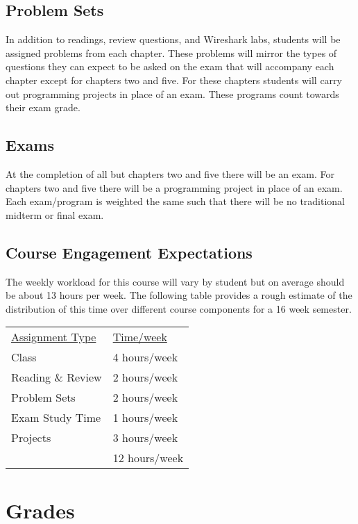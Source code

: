 \documentclass[10pt]{article}
\begin{document}
\subsection*{Problem Sets}

In addition to readings, review questions, and Wireshark labs, students will be assigned problems from each chapter. These problems will mirror the types of questions they can expect to be asked on the exam that will accompany each chapter except for chapters two and five. For these chapters students will carry out programming projects in place of an exam. These programs count towards their exam grade.

\subsection*{Exams}

At the completion of all but chapters two and five there will be an exam. For chapters two and five there will be a programming project in place of an exam. Each exam/program is weighted the same such that there will be no traditional midterm or final exam.

\subsection{Course Engagement Expectations}

The weekly workload for this course will vary by student but on average should be about 13 hours per week.  The following table provides a rough estimate of the distribution of this time over different course components for a 16 week semester.
\begin{center}
\begin{tabular}{ll}
\underline{Assignment Type}  & \underline{Time/week} \\
Class   & 4 hours/week \\
Reading \& Review  & 2 hours/week \\
Problem Sets & 2 hours/week \\
Exam Study Time & 1 hours/week \\
Projects  & 3 hours/week \\
\bottomrule
 & 12 hours/week
\end{tabular}
\end{center}


\section{Grades}
\end{document}
